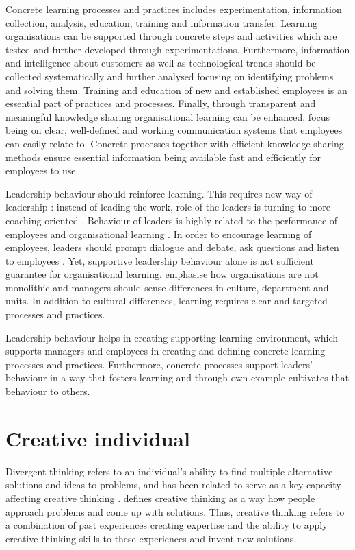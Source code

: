 Concrete learning processes and practices includes experimentation, information collection, analysis, education, training and information transfer. Learning organisations can be supported through concrete steps and activities which are tested and further developed through experimentations. Furthermore, information and intelligence about customers as well as technological trends should be collected systematically and further analysed focusing on identifying problems and solving them. Training and education of new and established employees is an essential part of practices and processes. Finally, through transparent and meaningful knowledge sharing organisational learning can be enhanced, focus being on clear, well-defined and working communication systems that employees can easily relate to. Concrete processes together with efficient knowledge sharing methods ensure essential information being available fast and efficiently for employees to use. \citep{garvin2008yours}

Leadership behaviour should reinforce learning. This requires new way of leadership \citep{shalley2004leaders}: instead of leading the work, role of the leaders is turning to more coaching-oriented \citep{hammer1993reengineering}. Behaviour of leaders is highly related to the performance of employees \citep{kim2014blue} and organisational learning \citep{garvin2008yours}. In order to encourage learning of employees, leaders should prompt dialogue and debate, ask questions and listen to employees \citep{kim2014blue,garvin2008yours}. Yet, supportive leadership behaviour alone is not sufficient guarantee for organisational learning. \citet{garvin2008yours}emphasise how organisations are not monolithic and managers should sense differences in culture, department and units. In addition to cultural differences, learning requires clear and targeted processes and practices. 

Leadership behaviour helps in creating supporting learning environment, which supports managers and employees in creating and defining concrete learning processes and practices. Furthermore, concrete processes support leaders' behaviour in a way that fosters learning and through own example cultivates that behaviour to others. \citep{garvin2008yours}

\section{Creative individual}
Divergent thinking refers to an individual's ability to find multiple alternative solutions and ideas to problems, and has been related to serve as a key capacity affecting creative thinking \citep{guilford1967creativity}. \citet{amabile1996assessing} defines creative thinking as a way how people approach problems and come up with solutions. Thus, creative thinking refers to a combination of past experiences creating expertise and the ability to apply creative thinking skills to these experiences and invent new solutions. \citep{amabile1998kill}

